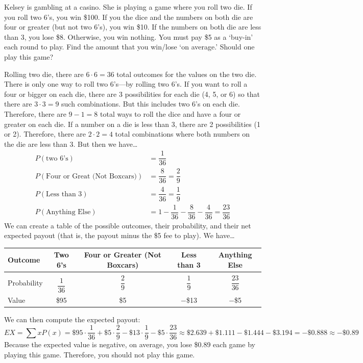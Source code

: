 \documentclass[11pt,letterpaper]{article}
\begin{document}

 Kelsey is gambling at a casino. She is playing a game where you roll two die. If you roll two 6's, you win \$100. If you the dice and the numbers on both die are four or greater (but not two 6's), you win \$10. If the numbers on both die are less than 3, you lose \$8. Otherwise, you win nothing. You must pay \$5 as a `buy-in' each round to play. Find the amount that you win/lose `on average.' Should one play this game? \pspace

\sol Rolling two die, there are $6 \cdot 6= 36$ total outcomes for the values on the two die. There is only one way to roll two 6's---by rolling two 6's. If you want to roll a four or bigger on each die, there are 3 possibilities for each die (4, 5, or 6) so that there are $3 \cdot 3= 9$ such combinations. But this includes two 6's on each die. Therefore, there are $9 - 1= 8$ total ways to roll the dice and have a four or greater on each die. If a number on a die is less than 3, there are 2 possibilities (1 or 2). Therefore, there are $2 \cdot 2= 4$ total combinations where both numbers on the die are less than 3. But then we have\dots
	\[
	\begin{aligned}
	P(\text{two 6's})&= \dfrac{1}{36} \\[0.3cm]
	P(\text{Four or Great (Not Boxcars)})&= \dfrac{8}{36}= \dfrac{2}{9} \\[0.3cm]
	P(\text{Less than 3})&= \dfrac{4}{36}= \dfrac{1}{9} \\[0.3cm]
	P(\text{Anything Else})&= 1 - \dfrac{1}{36} - \dfrac{8}{36} - \dfrac{4}{36}= \dfrac{23}{36}
	\end{aligned}
	\]
We can create a table of the possible outcomes, their probability, and their net expected payout (that is, the payout minus the \$5 fee to play). We have\dots \par
	\begin{table}[!ht]
	\centering
	\begin{tabular}{|l|c|c|c|c|} \hline
	Outcome & Two 6's & Four or Greater (Not Boxcars) & Less than 3 & Anything Else \\ \hline 
	Probability & $\dfrac{\stackrel{\phantom{1}}{1}}{36}$ & $\dfrac{2}{9}$ & $\dfrac{1}{9}$ & $\dfrac{23}{36}$ \\[0.3cm] \hline
	Value & \$95 & \$5 & $-$\$13 & $-$\$5 \\ \hline
	\end{tabular}
	\end{table} \par
We can then compute the expected payout:
	\[
	EX= \sum x P(x)= \$95 \cdot \dfrac{1}{36} + \$5 \cdot \dfrac{2}{9} - \$13 \cdot \dfrac{1}{9} - \$5 \cdot \dfrac{23}{36} \approx \$2.639 + \$1.111 - \$1.444 - \$3.194= -\$0.888 \approx -\$0.89
	\]
Because the expected value is negative, on average, you lose \$0.89 each game by playing this game. Therefore, you should not play this game. 
\end{document}
